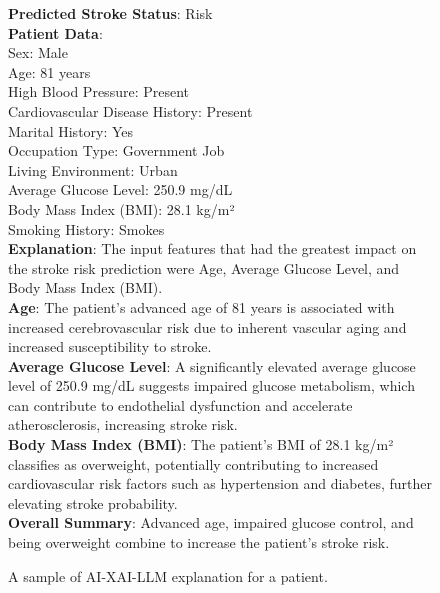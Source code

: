 \begin{figure}[!htbp]
\centering
\begin{tcolorbox}[
    colback=gray!5,        %
    colframe=gray!50,      %
    sharp corners,
    boxrule=0.2mm,         %
    fontupper=\ttfamily\footnotesize,
    left=1mm,
    right=1mm,
    boxsep=1mm,
    top=1mm,
    bottom=1mm
    ]
\textbf{Predicted Stroke Status}: Risk\\
\textbf{Patient Data}:\\
Sex: Male\\
Age: 81 years\\
High Blood Pressure: Present\\
Cardiovascular Disease History: Present\\
Marital History: Yes\\
Occupation Type: Government Job\\
Living Environment: Urban\\
Average Glucose Level: 250.9 mg/dL\\
Body Mass Index (BMI): 28.1 kg/m²\\
Smoking History: Smokes\\
\textbf{Explanation}: The input features that had the greatest impact on the stroke risk prediction were Age, Average Glucose Level, and Body Mass Index (BMI).\\
\textbf{Age}: The patient’s advanced age of 81 years is associated with increased cerebrovascular risk due to inherent vascular aging and increased susceptibility to stroke.\\
\textbf{Average Glucose Level}: A significantly elevated average glucose level of 250.9 mg/dL suggests impaired glucose metabolism, which can contribute to endothelial dysfunction and accelerate atherosclerosis, increasing stroke risk.\\
\textbf{Body Mass Index (BMI)}: The patient’s BMI of 28.1 kg/m² classifies as overweight, potentially contributing to increased cardiovascular risk factors such as hypertension and diabetes, further elevating stroke probability.\\
\textbf{Overall Summary}: Advanced age, impaired glucose control, and being overweight combine to increase the patient’s stroke risk.
\end{tcolorbox}
\caption{A sample of AI-XAI-LLM explanation for a patient.}
\label{graph-2}
\end{figure}


